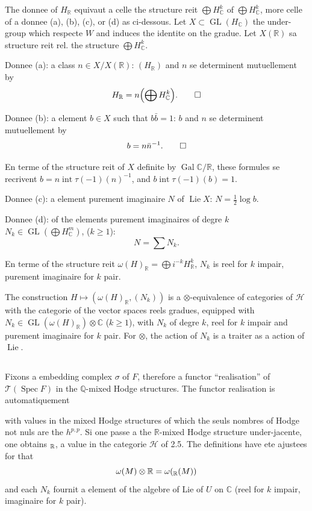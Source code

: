 \documentclass[12pt,a4paper]{article}
\theoremstyle{plain}
\theoremstyle{definition}
\theoremstyle{remark}
\DeclareMathOperator{\Spec}{Spec}
\DeclareMathOperator{\Lie}{Lie}
\DeclareMathOperator{\intt}{int}
\newcommand{\Q}{\mathbb{Q}}
\newcommand{\R}{\mathbb{R}}
\newcommand{\C}{\mathbb{C}}
\begin{document}
{The donn{e}e of $H_\R$ {e}quivaut {a} celle the structure r{e}it $\bigoplus H_\C^k$ of $\bigoplus H_\C^k$, more celle of a donn{e}e (a), (b), (c), or (d) as ci-dessous. Let $X\subset\operatorname{GL}(H_\C)$ the under-group which respecte $W$ and induces the identit{e} on the gradu{e}. Let $X(\R)$ sa structure r{e}it rel. the structure $\bigoplus H_\C^k$.

Donn{e}e (a): a class $n\in X/X(\R)$: $(H_\R)$ and $n$ se d{e}terminent mutuellement by
\begin{equation*}
H_\R = n\Bigl(\bigoplus H_\C^k\Bigr).\qedhere
\end{equation*}

Donn{e}e (b): a {e}l{e}ment $b\in X$ such that $b\bar{b}=1$: $b$ and $n$ se d{e}terminent mutuellement by
\begin{equation*}
b = n\bar{n}^{-1}.\qedhere
\end{equation*}

En terme of the structure r{e}it of $X$ d{e}finite by $\operatorname{Gal}\C/\R$, these formules se r{e}crivent $b=n\intt\tau(-1)(n)^{-1}$, and $b\intt\tau(-1)(b)=1$.

Donn{e}e (c): a {e}l{e}ment purement imaginaire $N$ of $\Lie X$: $N=\frac{1}{2}\log b$.

Donn{e}e (d): of the {e}l{e}ments purement imaginaires of degr{e} $k$ $N_k\in\operatorname{GL}(\bigoplus H_\C^m)$, ($k\geq 1$):
\begin{equation*}
N = \sum N_k.
\end{equation*}

En terme of the structure r{e}it $\omega(H)_\R=\bigoplus i^{-k}H_\R^k$, $N_k$ is r{e}el for $k$ impair, purement imaginaire for $k$ pair.

The construction $H\mapsto(\omega(H)_\R,(N_k))$ is a $\otimes$-{e}quivalence of cat{e}gories of $\mathscr{H}$ with the cat{e}gorie of the vector spaces r{e}els gradu{e}s, equipped with $N_k\in\operatorname{GL}(\omega(H)_\R)\otimes\C$ ($k\geq 1$), with $N_k$ of degr{e} $k$, r{e}el for $k$ impair and purement imaginaire for $k$ pair. For $\otimes$, the action of $N_k$ is {a} traiter as a action of $\Lie$.

\subsection{}

Fixons a embedding complex $\sigma$ of $F$, therefore a functor ``r{e}alisation'' of $\mathcal{T}(\Spec F)$ in the $\Q$-mixed Hodge structures. The functor r{e}alisation is automatiquement {with values in the mixed Hodge structures of which the seuls nombres of Hodge not nuls are the $h^{p,p}$. Si one passe {a} the $\R$-mixed Hodge structure under-jacente, one obtains $\real_\R$, {a} value in the cat{e}gorie $\mathscr{H}$ of 2.5. The d{e}finitions have {e}t{e} ajust{e}es for that
\begin{equation*}
\omega(M)\otimes\R = \omega(\real_\R(M))
\end{equation*}
and each $N_k$ fournit a {e}l{e}ment of the alg{e}bre of Lie of $U$ on $\C$ (r{e}el for $k$ impair, imaginaire for $k$ pair).

}}
\end{document}
